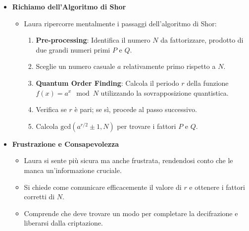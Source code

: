 \begin{itemize}
    \item \textbf{Richiamo dell'Algoritmo di Shor}
    \begin{itemize}
        \item Laura ripercorre mentalmente i passaggi dell'algoritmo di Shor:
        \begin{enumerate}
            \item \textbf{Pre-processing}: Identifica il numero \( N \) da fattorizzare, prodotto di due grandi numeri primi \( P \) e \( Q \).
            \item Sceglie un numero casuale \( a \) relativamente primo rispetto a \( N \).
            \item \textbf{Quantum Order Finding}: Calcola il periodo \( r \) della funzione \( f(x) = a^x \mod N \) utilizzando la sovrapposizione quantistica.
            \item Verifica se \( r \) è pari; se sì, procede al passo successivo.
            \item Calcola \( \text{gcd}(a^{r/2} \pm 1, N) \) per trovare i fattori \( P \) e \( Q \).
        \end{enumerate}
    \end{itemize}
    \item \textbf{Frustrazione e Consapevolezza}
    \begin{itemize}
        \item Laura si sente più sicura ma anche frustrata, rendendosi conto che le manca un'informazione cruciale.
        \item Si chiede come comunicare efficacemente il valore di \( r \) e ottenere i fattori corretti di \( N \).
        \item Comprende che deve trovare un modo per completare la decifrazione e liberarsi dalla criptazione.
    \end{itemize}
\end{itemize}
